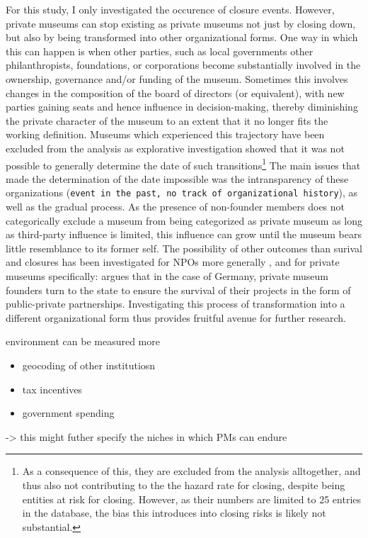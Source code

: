 \documentclass[12pt]{article}
\begin{document}
For this study, I only investigated the occurence of closure events.
However, private museums can stop existing as private museums not just by closing down, but also by being transformed into other organizational forms.
One way in which this can happen is when other parties, such as local governments other philanthropists, foundations, or corporations become substantially involved in the ownership, governance and/or funding of the museum.
Sometimes this involves changes in the composition of the board of directors (or equivalent), with new parties gaining seats and hence influence in decision-making, thereby diminishing the private character of the museum to an extent that it no longer fits the working definition.
Museums which experienced this trajectory have been excluded from the analysis as explorative investigation showed that it was not possible to generally determine the date of such transitions\footnote{As a consequence of this, they are excluded from the analysis alltogether, and thus also not contributing to the the hazard rate for closing, despite being entities at risk for closing. However, as their numbers are limited to 25 entries in the database, the bias this introduces into closing risks is likely not substantial.}
The main issues that made the determination of the date impossible was the intransparency of these organizations (\texttt{event in the past, no track of organizational history}), as well as the gradual process.
As the presence of non-founder members does not categorically exclude a museum from being categorized as private museum as long as third-party influence is limited, this influence can grow until the museum bears little resemblance to its former self.
The possibility of other outcomes than surival and closures has been investigated for NPOs more generally
\parencite{Searing_2020_zombies,HernandezOrtiz_2022_discontinuity,Helmig_Ingerfurth_Pinz_2013_nonprofit}, and for private museums specifically: 
\textcite{Walker_2019_collector} argues that in the case of Germany, private museum founders turn to the state to ensure the survival of their projects in the form of public-private partnerships.
Investigating this process of transformation into a different organizational form thus provides fruitful avenue for further research. 


environment can be measured more
\begin{itemize}
\item geocoding of other institutiosn
\item tax incentives
\item government spending
\end{itemize}
-> this might futher specify the niches in which PMs can endure
\end{document}
